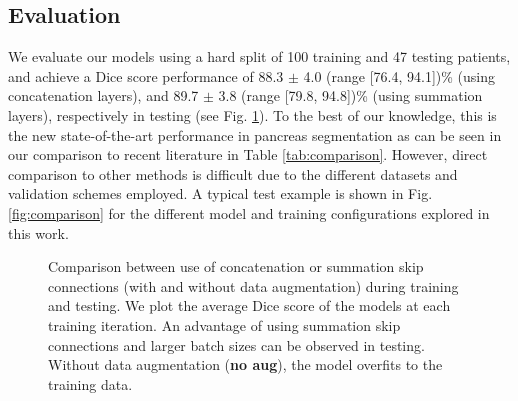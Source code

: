 \documentclass[a4paper]{spie}  %
\begin{document}
\subsection{Evaluation}
We evaluate our models using a hard split of 100 training and 47 testing patients, and achieve a Dice score performance of 88.3 $\pm$ 4.0 (range [76.4, 94.1])\% (using concatenation layers), and 89.7 $\pm$ 3.8 (range [79.8, 94.8])\% (using summation layers), respectively in testing (see Fig. \ref{fig:training}). To the best of our knowledge, this is the new state-of-the-art performance in pancreas segmentation as can be seen in our comparison to recent literature in Table \ref{tab:comparison}. However, direct comparison to other methods is difficult due to the different datasets and validation schemes employed. A typical test example is shown in Fig. \ref{fig:comparison} for the different model and training configurations explored in this work.
\begin{figure}[tb]
	\centering
	\caption{Comparison between use of concatenation or summation skip connections (with and without data augmentation) during training and testing. We plot the average Dice score of the models at each training iteration. An advantage of using summation skip connections and larger batch sizes can be observed in testing. Without data augmentation (\textbf{no aug}), the model overfits to the training data. \label{fig:training}}
\end{figure}
\end{document}
